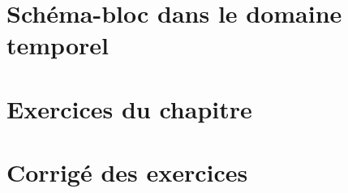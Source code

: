 \section{Schéma-bloc dans le domaine temporel}
\acplhp
\section*{Exercices du chapitre}
\section*{Corrigé des exercices}
